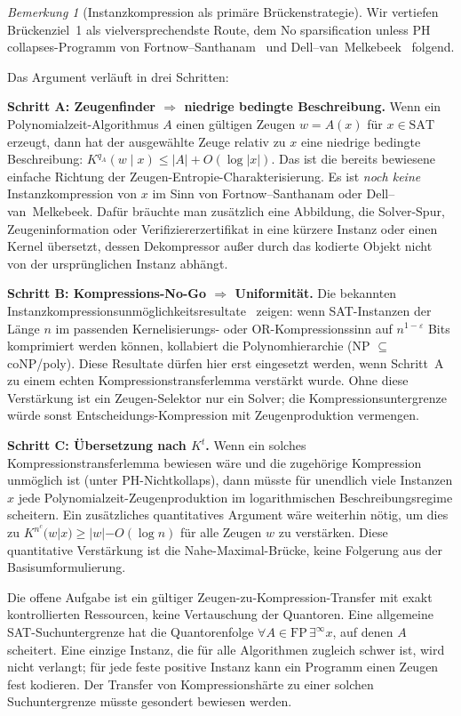 \documentclass[aps,prd,twocolumn,superscriptaddress,nofootinbib]{revtex4-2}
\theoremstyle{definition}
\theoremstyle{remark}
\newtheorem{remark}[theorem]{Bemerkung}
\begin{document}
\begin{remark}[Instanzkompression als primäre Brückenstrategie]
\label{rem:compression-bridge}
Wir vertiefen Brückenziel~1 als vielversprechendste Route, dem \glqq No sparsification unless PH collapses\grqq{}-Programm von Fortnow--Santhanam~\cite{FortnowSanthanam2011} und Dell--van~Melkebeek~\cite{DellMelkebeek2014} folgend.

Das Argument verläuft in drei Schritten:

\textbf{Schritt A: Zeugenfinder $\Rightarrow$ niedrige bedingte Beschreibung.}
Wenn ein Polynomialzeit-Algorithmus $A$ einen gültigen Zeugen $w=A(x)$ für $x\in\mathrm{SAT}$ erzeugt, dann hat der ausgewählte Zeuge relativ zu $x$ eine niedrige bedingte Beschreibung: $K^{q_A}(w\mid x)\leq |A|+O(\log |x|)$. Das ist die bereits bewiesene einfache Richtung der Zeugen-Entropie-Charakterisierung. Es ist \emph{noch keine} Instanzkompression von $x$ im Sinn von Fortnow--Santhanam oder Dell--van~Melkebeek. Dafür bräuchte man zusätzlich eine Abbildung, die Solver-Spur, Zeugeninformation oder Verifiziererzertifikat in eine kürzere Instanz oder einen Kernel übersetzt, dessen Dekompressor außer durch das kodierte Objekt nicht von der ursprünglichen Instanz abhängt.

\textbf{Schritt B: Kompressions-No-Go $\Rightarrow$ Uniformität.}
Die bekannten Instanzkompressionsunmöglichkeitsresultate~\cite{FortnowSanthanam2011,DellMelkebeek2014,Drucker2015} zeigen: wenn SAT-Instanzen der Länge $n$ im passenden Kernelisierungs- oder OR-Kompressionssinn auf $n^{1-\varepsilon}$ Bits komprimiert werden können, kollabiert die Polynomhierarchie (NP $\subseteq$ coNP/poly). Diese Resultate dürfen hier erst eingesetzt werden, wenn Schritt~A zu einem echten Kompressionstransferlemma verstärkt wurde. Ohne diese Verstärkung ist ein Zeugen-Selektor nur ein Solver; die Kompressionsuntergrenze würde sonst Entscheidungs-Kompression mit Zeugenproduktion vermengen.

\textbf{Schritt C: Übersetzung nach $K^t$.}
Wenn ein solches Kompressionstransferlemma bewiesen wäre und die zugehörige Kompression unmöglich ist (unter PH-Nichtkollaps), dann müsste für unendlich viele Instanzen $x$ jede Polynomialzeit-Zeugenproduktion im logarithmischen Beschreibungsregime scheitern. Ein zusätzliches quantitatives Argument wäre weiterhin nötig, um dies zu $K^{n^c}(w | x) \geq |w| - O(\log n)$ für alle Zeugen $w$ zu verstärken. Diese quantitative Verstärkung ist die Nahe-Maximal-Brücke, keine Folgerung aus der Basisumformulierung.

Die offene Aufgabe ist ein gültiger Zeugen-zu-Kompression-Transfer mit exakt kontrollierten Ressourcen, keine Vertauschung der Quantoren. Eine allgemeine SAT-Suchuntergrenze hat die Quantorenfolge $\forall A\in\mathrm{FP}\,\exists^\infty x$, auf denen $A$ scheitert. Eine einzige Instanz, die für alle Algorithmen zugleich schwer ist, wird nicht verlangt; für jede feste positive Instanz kann ein Programm einen Zeugen fest kodieren. Der Transfer von Kompressionshärte zu einer solchen Suchuntergrenze müsste gesondert bewiesen werden.
\end{remark}
\end{document}
